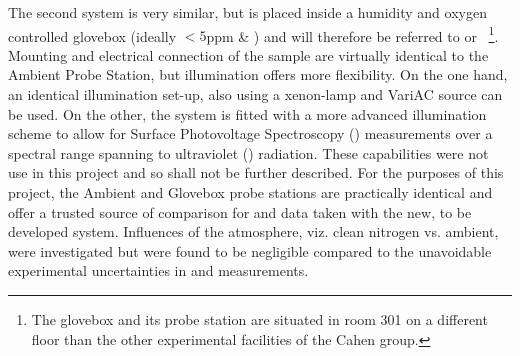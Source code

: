 The second system is very similar, but is placed inside a humidity and oxygen controlled glovebox (ideally $<\num{5}$ppm \oxy{} \& \water{}) and will therefore be referred to  or ~\footnote{The glovebox and its probe station are situated in room 301 on a different floor than the other experimental facilities of the Cahen group.}. Mounting and electrical connection of the sample are virtually identical to the Ambient Probe Station, but illumination offers more flexibility. On the one hand, an identical illumination set-up, also using a xenon-lamp and VariAC source can be used. On the other, the system is fitted with a more advanced illumination scheme to allow for Surface Photovoltage Spectroscopy (\sps{}) measurements over a spectral range spanning \ir{} to ultraviolet (\uv{}) radiation. These capabilities were not use in this project and so shall not be further described. For the purposes of this project, the Ambient and Glovebox probe stations are practically identical and offer a trusted source of comparison for \cpd{} and \spv{} data taken with the new, to be developed system. Influences of the atmosphere, viz. clean nitrogen vs. ambient, were investigated but were found to be negligible compared to the unavoidable experimental uncertainties in \cpd{} and \spv{} measurements.
